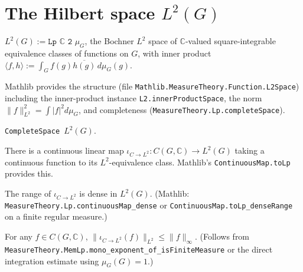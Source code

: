 \section{The Hilbert space $L^2(G)$}

\begin{definition}[$L^2(G)$]
  \label{def:L2}
  \leanok
  \mathlibok
  $L^2(G) := \texttt{Lp $\mathbb C$ 2 $\mu_G$}$, the Bochner $L^2$ space of
  $\mathbb C$-valued square-integrable equivalence classes of functions on
  $G$, with inner product
  $\langle f, h\rangle := \int_G f(g)\overline{h(g)}\,d\mu_G(g)$.

  Mathlib provides the structure (file
  \texttt{Mathlib.MeasureTheory.Function.L2Space}) including the
  inner-product instance \texttt{L2.innerProductSpace}, the norm
  $\|f\|_{L^2}^2 = \int |f|^2 d\mu_G$, and completeness
  (\texttt{MeasureTheory.Lp.completeSpace}).
\end{definition}

\begin{theorem}
  \label{thm:L2-Hilbert}
  \mathlibok
  \leanok
  \texttt{CompleteSpace $L^2(G)$}.
\end{theorem}

\begin{theorem}
  \label{thm:CG-into-L2}
  \mathlibok
  \leanok
  There is a continuous linear map
  $\iota_{C \to L^2} : C(G, \mathbb C) \to L^2(G)$ taking a continuous
  function to its $L^2$-equivalence class.
  Mathlib's \texttt{ContinuousMap.toLp} provides this.
\end{theorem}

\begin{theorem}
  \label{thm:CG-dense-L2}
  \mathlibok
  \leanok
  The range of $\iota_{C \to L^2}$ is dense in $L^2(G)$. (Mathlib:
  \texttt{MeasureTheory.Lp.continuousMap\_dense} or
  \texttt{ContinuousMap.toLp\_denseRange} on a finite regular measure.)
\end{theorem}

\begin{theorem}
  \label{thm:Lp-monotone}
  \mathlibok
  \leanok
  For any $f \in C(G, \mathbb C)$,
  $\|\iota_{C\to L^2}(f)\|_{L^2} \leq \|f\|_\infty$. (Follows from
  \texttt{MeasureTheory.MemLp.mono\_exponent\_of\_isFiniteMeasure} or
  the direct integration estimate using $\mu_G(G) = 1$.)
\end{theorem}


